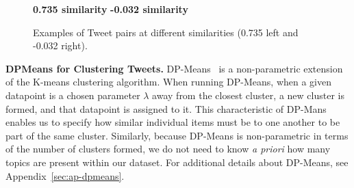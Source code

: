 \begin{figure}




\begin{minipage}{1\textwidth}
\hspace{100pt}
\tiny
\textbf{0.735 similarity}
\hspace{120pt}
\tiny
\textbf{-0.032 similarity}
\end{minipage}





\noindent{}
\noindent{}
\caption{Examples of  Tweet pairs at different similarities (0.735 left and -0.032 right).  }


\label{figure:paragraph_pairs}
\vspace{-10pt}
\end{figure}



\vspace{2pt}\noindent
\noindent
\textbf{DPMeans for Clustering Tweets.}
DP-Means~\cite{dinari2022revisiting} is a non-parametric extension of the K-means clustering algorithm. When running DP-Means, when a given datapoint is a chosen parameter $\lambda$ away from the closest cluster, a new cluster is formed, and that datapoint is assigned to it. This characteristic of DP-Mans enables us to specify how similar individual items must be to one another to be part of the same cluster. Similarly, because DP-Means is non-parametric in terms of the number of clusters formed, we do not need to know \textit{a priori} how many topics are present within our dataset. For additional details about DP-Means, see Appendix~\ref{sec:ap-dpmeans}.

